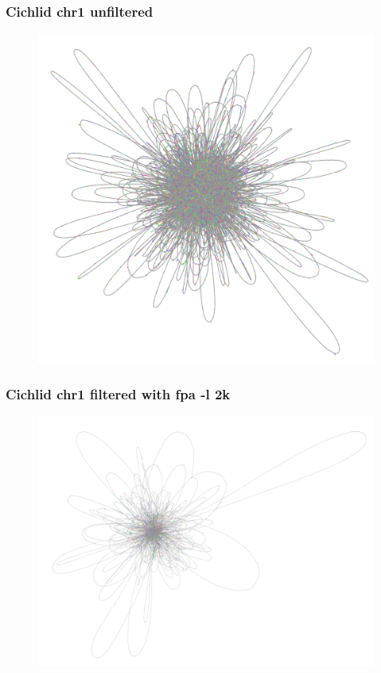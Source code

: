 \documentclass[aspectratio=169]{beamer}
\begin{document}
\begin{frame}
  \frametitle{Cichlid chr1 unfiltered}
    \begin{figure}
      \includegraphics[scale=0.17,center]{seqwish-cichlid-chr1.png}
    \end{figure}
\end{frame}

\begin{frame}
  \frametitle{Cichlid chr1 filtered with fpa -l 2k}
    \begin{figure}
      \includegraphics[scale=0.17,center]{seqwish-cichlid-chr1-fpal2k.png}
    \end{figure}
\end{frame}
\end{document}
